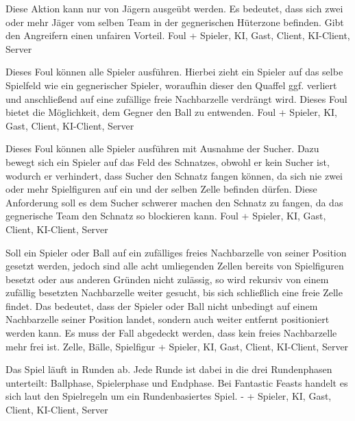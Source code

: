         {Diese Aktion kann nur von Jägern ausgeübt werden. Es bedeutet, dass sich zwei oder mehr Jäger vom selben Team in der gegnerischen Hüterzone befinden.}
        {Gibt den Angreifern einen unfairen Vorteil.}
        {Foul}
        {+}
        {Spieler, KI, Gast, Client, KI-Client, Server}

        {Dieses Foul können alle Spieler ausführen. Hierbei zieht ein Spieler auf das selbe Spielfeld wie ein gegnerischer Spieler, woraufhin dieser den Quaffel ggf. verliert und anschließend auf eine zufällige freie Nachbarzelle verdrängt wird.}
        {Dieses Foul bietet die Möglichkeit, dem Gegner den Ball zu entwenden.}
        {Foul}
        {+}
        {Spieler, KI, Gast, Client, KI-Client, Server}

        {Dieses Foul können alle Spieler ausführen mit Ausnahme der Sucher. Dazu bewegt sich ein Spieler auf das Feld des Schnatzes, obwohl er kein Sucher ist, wodurch er verhindert, dass Sucher den Schnatz fangen können, da sich nie zwei oder mehr Spielfiguren auf ein und der selben Zelle befinden dürfen.}
        {Diese Anforderung soll es dem Sucher schwerer machen den Schnatz zu fangen, da das gegnerische Team den Schnatz so blockieren kann.}
        {Foul}
        {+}
        {Spieler, KI, Gast, Client, KI-Client, Server}
        
        {Soll ein Spieler oder Ball auf ein zufälliges freies Nachbarzelle von seiner Position gesetzt werden, jedoch sind alle acht umliegenden Zellen bereits von Spielfiguren besetzt oder aus anderen Gründen nicht zulässig, so wird rekursiv von einem zufällig besetzten Nachbarzelle weiter gesucht, bis sich schließlich eine freie Zelle findet. Das bedeutet, dass der Spieler oder Ball nicht unbedingt auf einem Nachbarzelle seiner Position landet, sondern auch weiter entfernt positioniert werden kann.}
        {Es muss der Fall abgedeckt werden, dass kein freies Nachbarzelle mehr frei ist.}
        {Zelle, Bälle, Spielfigur}
        {+}
        {Spieler, KI, Gast, Client, KI-Client, Server}


        {Das Spiel läuft in Runden ab. Jede Runde ist dabei in die drei Rundenphasen unterteilt: Ballphase, Spielerphase und Endphase.}
        {Bei \glqq{}Fantastic Feasts\grqq{} handelt es sich laut den Spielregeln um ein Rundenbasiertes Spiel.}
        {-}
        {+}
        {Spieler, KI, Gast, Client, KI-Client, Server}

